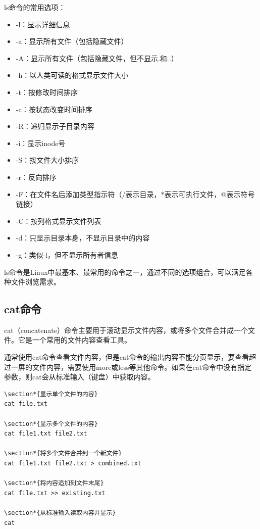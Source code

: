 \documentclass[12pt,UTF8]{ctexbook}
\begin{document}
ls命令的常用选项：
\begin{itemize}
    \item -l：显示详细信息
    \item -a：显示所有文件（包括隐藏文件）
    \item -A：显示所有文件（包括隐藏文件，但不显示.和..）
    \item -h：以人类可读的格式显示文件大小
    \item -t：按修改时间排序
    \item -c：按状态改变时间排序
    \item -R：递归显示子目录内容
    \item -i：显示inode号
    \item -S：按文件大小排序
    \item -r：反向排序
    \item -F：在文件名后添加类型指示符（/表示目录，*表示可执行文件，@表示符号链接）
    \item -C：按列格式显示文件列表
    \item -d：只显示目录本身，不显示目录中的内容
    \item -g：类似-l，但不显示所有者信息
\end{itemize}

ls命令是Linux中最基本、最常用的命令之一，通过不同的选项组合，可以满足各种文件浏览需求。

\subsection{cat命令}
cat（concatenate）命令主要用于滚动显示文件内容，或将多个文件合并成一个文件。它是一个常用的文件内容查看工具。

通常使用cat命令查看文件内容，但是cat命令的输出内容不能分页显示，要查看超过一屏的文件内容，需要使用more或less等其他命令。如果在cat命令中没有指定参数，则cat会从标准输入（键盘）中获取内容。

\begin{verbatim}
\section*{显示单个文件的内容}
cat file.txt

\section*{显示多个文件的内容}
cat file1.txt file2.txt

\section*{将多个文件合并到一个新文件}
cat file1.txt file2.txt > combined.txt

\section*{将内容追加到文件末尾}
cat file.txt >> existing.txt

\section*{从标准输入读取内容并显示}
cat
\end{verbatim}
\end{document}
